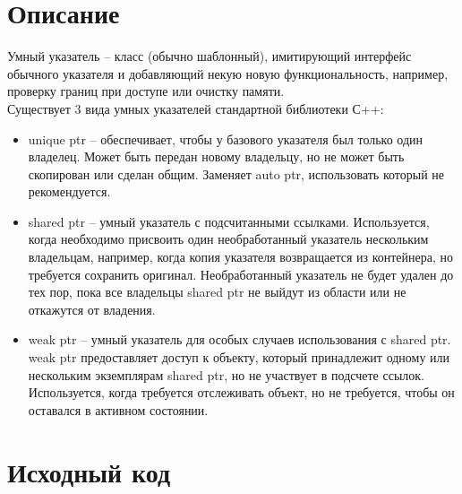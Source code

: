 \section{Описание}

Умный указатель -- класс (обычно шаблонный), имитирующий интерфейс обычного указателя и добавляющий некую новую функциональность, например, проверку границ при доступе или очистку памяти. \\
Существует 3 вида умных указателей стандартной библиотеки С++:
\begin{itemize}
\item{unique ptr -- обеспечивает, чтобы у базового указателя был только один владелец. Может быть передан новому владельцу, но не может быть скопирован или сделан общим. Заменяет auto ptr, использовать который не рекомендуется.}
\item{shared ptr -- умный указатель с подсчитанными ссылками. Используется, когда необходимо присвоить один необработанный указатель нескольким владельцам, например, когда копия указателя возвращается из контейнера, но требуется сохранить оригинал. Необработанный указатель не будет удален до тех пор, пока все владельцы shared ptr не выйдут из области или не откажутся от владения.}
\item{weak ptr -- умный указатель для особых случаев использования с shared ptr. weak ptr предоставляет доступ к объекту, который принадлежит одному или нескольким экземплярам shared ptr, но не участвует в подсчете ссылок. Используется, когда требуется отслеживать объект, но не требуется, чтобы он оставался в активном состоянии.}
\end{itemize}


\section{Исходный код}


